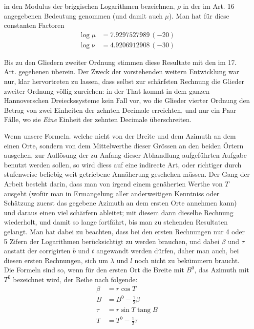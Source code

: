 %
in den Modulus der briggischen Logarithmen bezeichnen, \(\rho\) in der im Art. 16 angegebenen Bedeutung genommen (und damit auch \(\mu\)). Man hat für diese constanten Factoren
\[
\begin{aligned}
\log\mu&=7.9297527989\,(-20)\\
\log\nu&=4.9206912908\,(-30)
\end{aligned}
\]

\indent Bis zu den Gliedern zweiter Ordnung stimmen diese Resultate mit den im 17. Art. gegebenen überein. Der Zweck der vorstehenden weitern Entwicklung war nur, klar hervortreten zu lassen, dass selbst zur schärfsten Rechnung die Glieder zweiter Ordnung völlig zureichen: in der That kommt in dem ganzen Hannoverschen Dreieckssysteme kein Fall vor, wo die Glieder vierter Ordnung den Betrag von zwei Einheiten der zehnten Decimale erreichten, und nur ein Paar Fälle, wo sie \textit{Eine} Einheit der zehnten Decimale überschreiten.

Wenn unsere Formeln. welche nicht von der Breite und dem Azimuth an dem einen Orte, sondern von dem Mittelwerthe dieser Grössen an den beiden Örtern ausgehen, zur Auflösung der zu Anfang dieser Abhandlung aufgeführten Aufgabe benutzt werden sollen, so wird diess auf eine indirecte Art, oder richtiger durch stufenweise beliebig weit getriebene Annäherung geschehen müssen. Der Gang der Arbeit besteht darin, dass man von irgend einem genäherten Werthe von \(T\) ausgeht (wofür man in Ermangelung aller anderweitigen Kenntniss oder Schätzung zuerst das gegebene Azimuth an dem ersten Orte annehmen kann) und daraus einen viel schärfern ableitet; mit diesem dann dieselbe Rechnung wiederholt, und damit so lange fortfährt, bis man zu stehenden Resultaten gelangt. Man hat dabei zu beachten, dass bei den ersten Rechnungen nur 4 oder 5 Zifern der Logarithmen berücksichtigt zu werden brauchen, und dabei \(\beta\) und \(\tau\) anstatt der corrigirten \(b\) und \(t\) angewandt werden dürfen, daher man auch, bei diesen ersten Rechnungen, sich um \(\lambda\) und \(l\) noch nicht zu bekümmern braucht. Die Formeln sind so, wenn für den ersten Ort die Breite mit \(B^0\), das Azimuth mit \(T^0\) bezeichnet wird, der Reihe nach folgende:
\[
\begin{aligned}
\beta&=r\cos T\\
B&=B^0-\tfrac12\beta\\
\tau&=r\sin T\operatorname{tang}B\\
T&=T^0-\tfrac12\tau
\end{aligned}
\]
